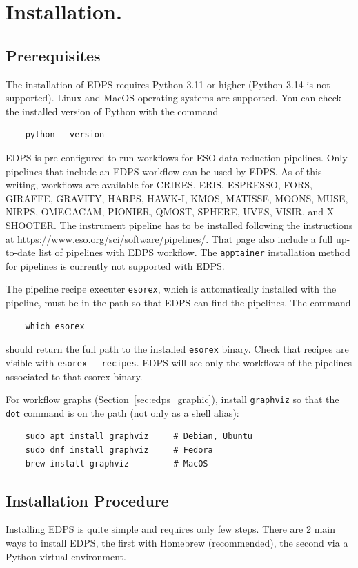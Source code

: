 
\section{Installation.}
\label{sec:edps_installation}


\subsection{Prerequisites}

The installation of EDPS requires Python 3.11 or higher (Python 3.14 is not supported). Linux and MacOS operating systems are supported. You can check the installed version of Python with the command
\begin{verbatim}
    python --version
\end{verbatim}

EDPS is pre-configured to run workflows for ESO data reduction pipelines. Only pipelines that include an EDPS workflow can be used by EDPS. As of this writing, workflows are available for CRIRES, ERIS, ESPRESSO, FORS, GIRAFFE, GRAVITY, HARPS, HAWK-I, KMOS, MATISSE, MOONS, MUSE, NIRPS, OMEGACAM, PIONIER, QMOST, SPHERE, UVES, VISIR, and X-SHOOTER. The instrument pipeline has to be installed following the instructions at 
\url{https://www.eso.org/sci/software/pipelines/}. That page also include a full up-to-date list of pipelines with EDPS workflow. The {\tt apptainer} installation method for pipelines is currently not supported with EDPS.

The pipeline recipe executer {\tt esorex}, which is automatically installed with the pipeline, must be in the  path so that EDPS can find the pipelines. The command 
\begin{verbatim}
    which esorex
\end{verbatim}
 should return the full path to the installed {\tt esorex} binary. Check that recipes are visible with \verb|esorex --recipes|. EDPS will see only the workflows of the pipelines associated to that esorex binary.

For workflow graphs (Section~\ref{sec:edps_graphic}), install {\tt graphviz} so that the {\tt dot} command is on the path (not only as a shell alias):
\begin{verbatim}
    sudo apt install graphviz     # Debian, Ubuntu
    sudo dnf install graphviz     # Fedora
    brew install graphviz         # MacOS
\end{verbatim}

\subsection{Installation Procedure}
\label{sec:edps_installation_procedure}
Installing EDPS is quite simple and requires only few steps. There are 2 main ways to install EDPS, the first with Homebrew (recommended), the second via a Python virtual environment.


